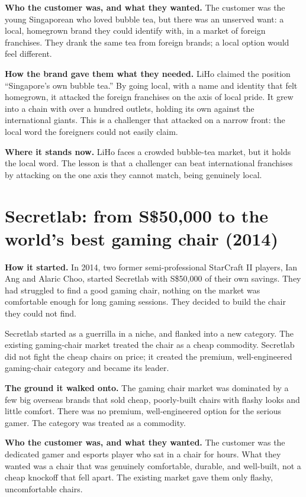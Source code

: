 \documentclass[10pt,twoside,openany]{memoir}
\newcommand{\needspacehead}{\needspace{4\baselineskip}}
\let\oldsection\section
\renewcommand{\section}{\needspacehead\oldsection}
\begin{document}
\textbf{Who the customer was, and what they wanted.} The customer was
the young Singaporean who loved bubble tea, but there was an unserved
want: a local, homegrown brand they could identify with, in a market of
foreign franchises. They drank the same tea from foreign brands; a local
option would feel different.

\textbf{How the brand gave them what they needed.} LiHo claimed the
position ``Singapore's own bubble tea.'' By going local, with a name and
identity that felt homegrown, it attacked the foreign franchises on the
axis of local pride. It grew into a chain with over a hundred outlets,
holding its own against the international giants. This is a challenger
that attacked on a narrow front: the local word the foreigners could not
easily claim.

\textbf{Where it stands now.} LiHo faces a crowded bubble-tea market,
but it holds the local word. The lesson is that a challenger can beat
international franchises by attacking on the one axis they cannot match,
being genuinely local.

\section{Secretlab: from S\$50,000 to the world's best gaming chair
(2014)}\label{secretlab-from-s50000-to-the-worlds-best-gaming-chair-2014}

\textbf{How it started.} In 2014, two former semi-professional StarCraft
II players, Ian Ang and Alaric Choo, started Secretlab with S\$50,000 of
their own savings. They had struggled to find a good gaming chair,
nothing on the market was comfortable enough for long gaming sessions.
They decided to build the chair they could not find.

Secretlab started as a guerrilla in a niche, and flanked into a new
category. The existing gaming-chair market treated the chair as a cheap
commodity. Secretlab did not fight the cheap chairs on price; it created
the premium, well-engineered gaming-chair category and became its
leader.

\textbf{The ground it walked onto.} The gaming chair market was
dominated by a few big overseas brands that sold cheap, poorly-built
chairs with flashy looks and little comfort. There was no premium,
well-engineered option for the serious gamer. The category was treated
as a commodity.

\textbf{Who the customer was, and what they wanted.} The customer was
the dedicated gamer and esports player who sat in a chair for hours.
What they wanted was a chair that was genuinely comfortable, durable,
and well-built, not a cheap knockoff that fell apart. The existing
market gave them only flashy, uncomfortable chairs.
\end{document}
